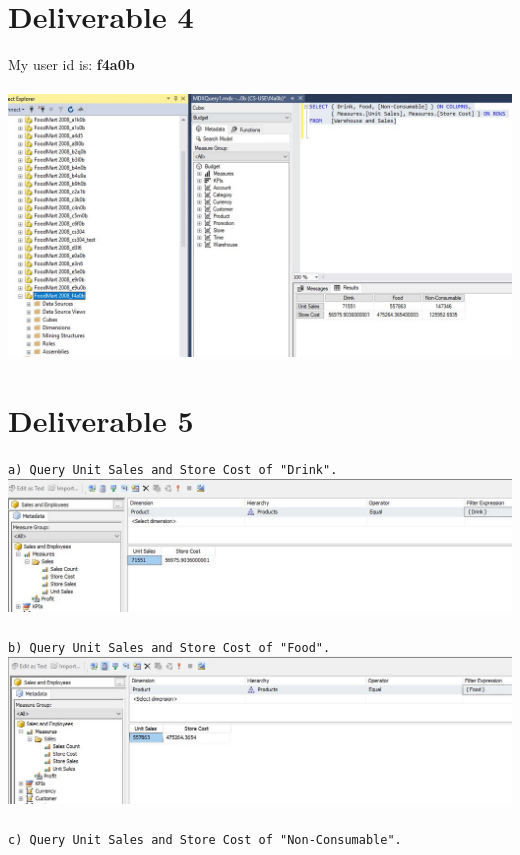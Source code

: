 \documentclass{article}
\begin{document}
\section{Deliverable 4}

My user id is: \textbf{f4a0b} \\
\\
\noindent \includegraphics[scale=0.68]{deliverable4.jpg}

\section{Deliverable 5}

\texttt{a) Query Unit Sales and Store Cost of "Drink".}\\

\noindent \includegraphics[scale=0.72]{deliverable5_1.jpg}\\
\\
\noindent \texttt{b) Query Unit Sales and Store Cost of "Food".}\\

\noindent \includegraphics[scale=0.71]{deliverable5_2.jpg}\\
\\
\noindent \texttt{c) Query Unit Sales and Store Cost of "Non-Consumable".}\\
\end{document}
